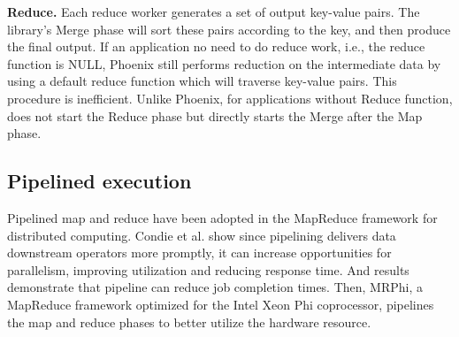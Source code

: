 {\bf Reduce.}
Each reduce worker generates a set of output key-value pairs.
The library's Merge phase will sort these pairs according to the key, and then produce the final output. 
If an application no need to do reduce work, i.e., the reduce function is NULL,
Phoenix still performs reduction on the intermediate data by using a default reduce function which will traverse key-value pairs. 
This procedure is inefficient. 
Unlike Phoenix, for applications without Reduce function, \myds does not start the Reduce phase but directly starts the Merge after the Map phase.


\subsection{Pipelined execution}
Pipelined map and reduce have been adopted in the MapReduce framework for distributed computing\cite{Condie2010mapreduce}. 
Condie et al. show since pipelining delivers data downstream operators more promptly, it can increase opportunities for parallelism, improving utilization and reducing response time.
And results demonstrate that pipeline can reduce job completion times.
Then, MRPhi\cite{lu2013mrphi}, a MapReduce framework optimized for the Intel Xeon Phi coprocessor, pipelines the map and reduce phases to better utilize the hardware resource.

 




